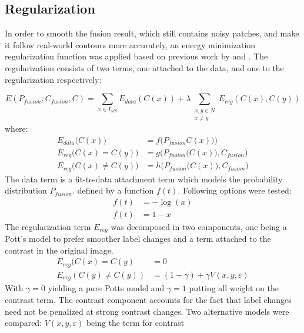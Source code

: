 \documentclass[10pt]{article}
\begin{document}
\subsection{Regularization}\label{sec:regularization}
In order to smooth the fusion result, which still contains noisy patches, and make it follow real-world contours more accurately, an energy minimization regularization function was applied based on previous work by \cite{hervieu_fusion_2016} and \cite{ouerghemmi_two-step_2017}. The regularization consists of two terms, one attached to the data, and one to the regularization respectively:

\[E(P_{fusion},C_{fusion},C)=\sum_{x\in I_{MS}}E_{data}(C(x))+\lambda\sum _{\substack{x,y\in N\\x\neq y}}E_{reg}(C(x),C(y)) \]
where:
\begin{align}
E_{data}\big(C(x)\big)&=f\Big(P_{fusion}C(x)\big)\Big)\\
E_{reg}\big(C(x)=C(y)\big)&=g\Big(P_{fusion}\big(C(x)\big),C_{fusion}\Big)\\
E_{reg}\big(C(x)\neq C(y)\big)&=h\Big(P_{fusion}\big(C(x)\big),C_{fusion}\Big)
\end{align}
The data term is a fit-to-data attachment term which models the probability distribution $P_{fusion}$. defined by a function $f(t)$. Following options were tested:
\begin{align}
f(t)&=-\log(x)\\
f(t)&=1-x
\end{align}
The regularization term $E_{reg}$ was decomposed in two components, one being a Pott's model to prefer smoother label changes and a term attached to the contrast in the original image.
\begin{align}
    E_{reg}(C(x)=C(y)&=0\\ 
    E_{reg}(C(y)\neq C(y))&=(1-\gamma)+\gamma V(x,y,\varepsilon)
\end{align}
With $\gamma = 0$ yielding a pure Potts model and $\gamma = 1$ putting all weight on the contrast term. The contrast component accounts for the fact that label changes need not be penalized at strong contrast changes. Two alternative models were compared:
$V(x,y,\varepsilon)$ being the term for contrast
\end{document}
